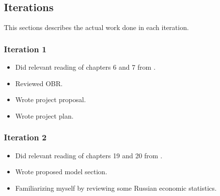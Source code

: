 \subsection{Iterations}
This sections describes the actual work done in each iteration.

\subsubsection{Iteration 1}
\begin{itemize}
\item Did relevant reading of chapters 6 and 7 from \parencite{economics-book}.
\item Reviewed OBR.
\item Wrote project proposal.
\item Wrote project plan.
\end{itemize}

\subsubsection{Iteration 2}
\begin{itemize}
\item Did relevant reading of chapters 19 and 20 from \parencite{economics-book}.
\item Wrote proposed model section.
\item Familiarizing myself by reviewing some Russian economic statistics.
\end{itemize}
